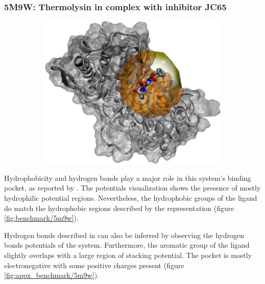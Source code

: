     \subsubsection{5M9W: Thermolysin in complex with inhibitor JC65}
      \begin{figure}[H] \centering
        \begin{subfigure}[c]{0.3\textwidth} \centering
          \includegraphics[width=1\textwidth]{figures/results/ps_prot/5m9w.png}
        \end{subfigure}
        \begin{subfigure}[c]{0.3\textwidth} \centering
        \end{subfigure}
      \end{figure}

      Hydrophobicity and hydrogen bonds play a major role in this system's binding pocket, as reported by \cite{hydrophobic_2017}. The potentials visualization shows the presence of mostly hydrophilic potential regions. Nevertheless, the hydrophobic groups of the ligand do match the hydrophobic regions described by the representation (figure \ref{fig:benchmark/5m9w}).

      Hydrogen bonds described in \cite{hydrophobic_2017} can also be inferred by observing the hydrogen bonds potentials of the system. Furthermore, the aromatic group of the ligand slightly overlaps with a large region of stacking potential. The pocket is mostly electronegative with some positive charges present (figure \ref{fig:appx_benchmark/5m9w}).

